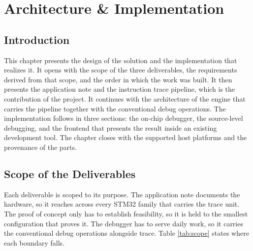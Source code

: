 \chapter{Architecture \& Implementation}

\section*{Introduction}
This chapter presents the design of the solution and the implementation that realizes it. It opens with the scope of the three deliverables, the requirements derived from that scope, and the order in which the work was built. It then presents the application note and the instruction trace pipeline, which is the contribution of the project. It continues with the architecture of the engine that carries the pipeline together with the conventional debug operations. The implementation follows in three sections: the on-chip debugger, the source-level debugging, and the frontend that presents the result inside an existing development tool. The chapter closes with the supported host platforms and the provenance of the parts.

\section{Scope of the Deliverables}
\label{subsec:scope}

Each deliverable is scoped to its purpose. The application note documents the hardware, so it reaches across every STM32 family that carries the trace unit. The proof of concept only has to establish feasibility, so it is held to the smallest configuration that proves it. The debugger has to serve daily work, so it carries the conventional debug operations alongside trace. Table \ref{tab:scope} states where each boundary falls.

